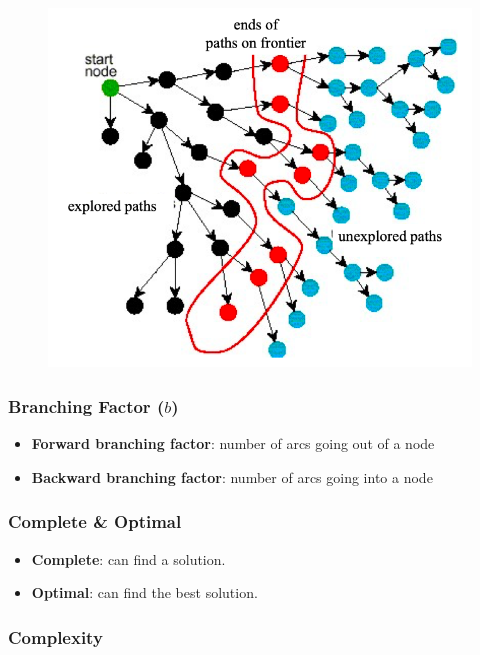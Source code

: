\documentclass{article}
\begin{document}
\begin{figure}[H]
    \includegraphics[width=\textwidth]{generic_search_algo_visualization}
    \centering
\end{figure}

\subsubsection{Branching Factor ($b$)}

\begin{itemize}
    \item \textbf{Forward branching factor}: number of arcs going out of a node
    \item \textbf{Backward branching factor}: number of arcs going into a node
\end{itemize}

\subsubsection{Complete \& Optimal}

\begin{itemize}
    \item \textbf{Complete}: can find a solution.
    \item \textbf{Optimal}: can find the best solution.
\end{itemize}

\subsubsection{Complexity}
\end{document}
